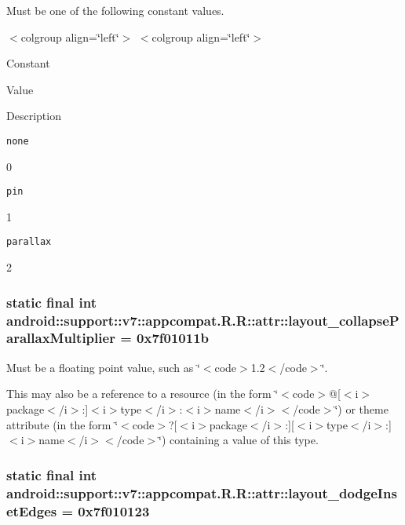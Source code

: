 Must be one of the following constant values. \begin{TabularC}{0}
\hline
\end{TabularC}
$<$colgroup align=\char`\"{}left\char`\"{}$>$ $<$colgroup align=\char`\"{}left\char`\"{}$>$ 

Constant

Value

Description 

{\tt none}

0

{\tt pin}

1

{\tt parallax}

2\hypertarget{classandroid_1_1support_1_1v7_1_1appcompat_1_1_r_1_1attr_39c0da563750485f4bcf4eaee21416ed}{
\subsubsection[{layout\_\-collapseParallaxMultiplier}]{\setlength{\rightskip}{0pt plus 5cm}static final int android::support::v7::appcompat.R.R::attr::layout\_\-collapseParallaxMultiplier = 0x7f01011b}}
\label{classandroid_1_1support_1_1v7_1_1appcompat_1_1_r_1_1attr_39c0da563750485f4bcf4eaee21416ed}


Must be a floating point value, such as \char`\"{}$<$code$>$1.2$<$/code$>$\char`\"{}. 

This may also be a reference to a resource (in the form \char`\"{}$<$code$>$@\mbox{[}$<$i$>$package$<$/i$>$:\mbox{]}$<$i$>$type$<$/i$>$:$<$i$>$name$<$/i$>$$<$/code$>$\char`\"{}) or theme attribute (in the form \char`\"{}$<$code$>$?\mbox{[}$<$i$>$package$<$/i$>$:\mbox{]}\mbox{[}$<$i$>$type$<$/i$>$:\mbox{]}$<$i$>$name$<$/i$>$$<$/code$>$\char`\"{}) containing a value of this type. \hypertarget{classandroid_1_1support_1_1v7_1_1appcompat_1_1_r_1_1attr_aef55865ca112a3597895ebbd22a657d}{
\subsubsection[{layout\_\-dodgeInsetEdges}]{\setlength{\rightskip}{0pt plus 5cm}static final int android::support::v7::appcompat.R.R::attr::layout\_\-dodgeInsetEdges = 0x7f010123}}
\label{classandroid_1_1support_1_1v7_1_1appcompat_1_1_r_1_1attr_aef55865ca112a3597895ebbd22a657d}


